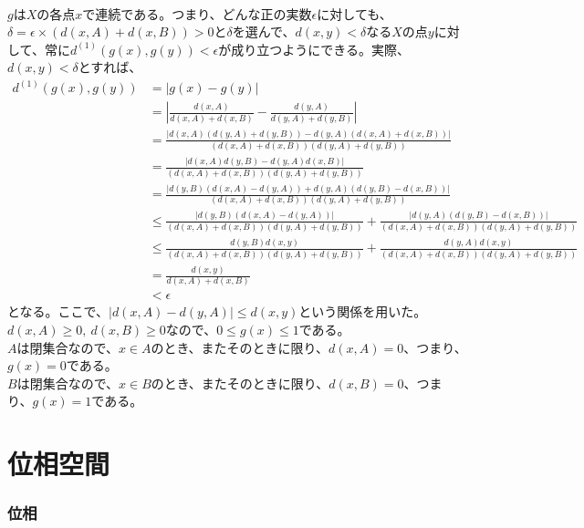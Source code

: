 \documentclass{jsarticle}
\begin{document}
\subsection{}
$g$は$X$の各点$x$で連続である。つまり、どんな正の実数$\epsilon$に対しても、$\delta=\epsilon\times(d(x,A)+d(x,B))>0$と$\delta$を選んで、$d(x,y)<\delta$なる$X$の点$y$に対して、常に$d^{(1)}(g(x),g(y))<\epsilon$が成り立つようにできる。実際、$d(x,y)<\delta$とすれば、
\begin{align*}
d^{(1)}(g(x),g(y))&=|g(x)-g(y)|\\
&=|\frac{d(x,A)}{d(x,A)+d(x,B)}-\frac{d(y,A)}{d(y,A)+d(y,B)}|\\
&=\frac{|d(x,A)(d(y,A)+d(y,B))-d(y,A)(d(x,A)+d(x,B))|}{(d(x,A)+d(x,B))(d(y,A)+d(y,B))}\\
&=\frac{|d(x,A)d(y,B)-d(y,A)d(x,B)|}{(d(x,A)+d(x,B))(d(y,A)+d(y,B))}\\
&=\frac{|d(y,B)(d(x,A)-d(y,A))+d(y,A)(d(y,B)-d(x,B))|}{(d(x,A)+d(x,B))(d(y,A)+d(y,B))}\\
&\leq\frac{|d(y,B)(d(x,A)-d(y,A))|}{(d(x,A)+d(x,B))(d(y,A)+d(y,B))}+\frac{|d(y,A)(d(y,B)-d(x,B))|}{(d(x,A)+d(x,B))(d(y,A)+d(y,B))}\\
&\leq\frac{d(y,B)d(x,y)}{(d(x,A)+d(x,B))(d(y,A)+d(y,B))}+\frac{d(y,A)d(x,y)}{(d(x,A)+d(x,B))(d(y,A)+d(y,B))}\\
&=\frac{d(x,y)}{d(x,A)+d(x,B)}\\
&<\epsilon
\end{align*}
となる。ここで、$|d(x,A)-d(y,A)|\leq d(x,y)$という関係を用いた。\\
$d(x,A)\geq 0,\ d(x,B)\geq0$なので、$0\leq g(x)\leq 1$である。\\
$A$は閉集合なので、$x\in A$のとき、またそのときに限り、$d(x,A)=0$、つまり、$g(x)=0$である。\\
$B$は閉集合なので、$x\in B$のとき、またそのときに限り、$d(x,B)=0$、つまり、$g(x)=1$である。








\part{位相空間}
\section{位相}
\end{document}
